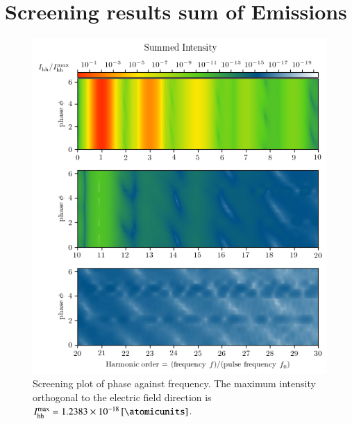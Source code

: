\documentclass[11pt, a4paper]{scrartcl}
\begin{document}
\section{Screening results sum of Emissions}
\begin{figure}[H]
    \centering
    \includegraphics[width=\textwidth]{phase=variable_full_plot.png}
    \caption{Screening plot of phase against frequency. The maximum intensity orthogonal
      to the electric field direction is $I_{\mathrm{hh}}^{\mathrm{max}} = \SI{1.2383e-18}{[\atomicunits]}$.}
    \label{fig:sec1_full_screening}
\end{figure}
\end{document}
